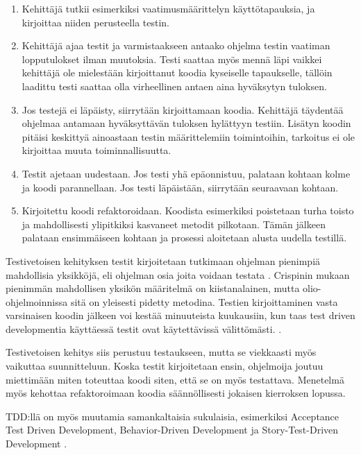 \documentclass[finnish]{tktltiki2}
\theoremstyle{definition}
\theoremstyle{remark}
\begin{document}
\begin{enumerate}

  \item Kehittäjä tutkii esimerkiksi vaatimusmäärittelyn käyttötapauksia, ja kirjoittaa niiden perusteella testin.

  \item Kehittäjä ajaa testit ja varmistaakseen antaako ohjelma testin vaatiman lopputulokset ilman muutoksia. Testi saattaa myös mennä läpi vaikkei kehittäjä ole mielestään kirjoittanut koodia kyseiselle tapaukselle, tällöin laadittu testi saattaa olla virheellinen antaen aina hyväksytyn tuloksen.

  \item Jos testejä ei läpäisty, siirrytään kirjoittamaan koodia. Kehittäjä täydentää ohjelmaa antamaan hyväksyttävän tuloksen hylättyyn testiin. Lisätyn koodin pitäisi keskittyä ainoastaan testin määrittelemiin toimintoihin, tarkoitus ei ole kirjoittaa muuta toiminnallisuutta.

 \item Testit ajetaan uudestaan. Jos testi yhä epäonnistuu, palataan kohtaan kolme ja koodi parannellaan. Jos testi läpäistään, siirrytään seuraavaan kohtaan.

 \item Kirjoitettu koodi refaktoroidaan. Koodista esimerkiksi poistetaan turha toisto ja mahdollisesti ylipitkiksi kasvaneet metodit pilkotaan. Tämän jälkeen palataan ensimmäiseen kohtaan ja prosessi aloitetaan alusta uudella testillä.

\end{enumerate}

Testivetoisen kehityksen testit kirjoitetaan tutkimaan ohjelman pienimpiä mahdollisia yksikköjä, eli ohjelman osia joita voidaan testata \cite{Crispin06}. Crispinin mukaan pienimmän mahdollisen yksikön määritelmä on kiistanalainen, mutta olio-ohjelmoinnissa sitä on yleisesti pidetty metodina. Testien kirjoittaminen vasta varsinaisen koodin jälkeen voi kestää minuuteista kuukausiin, kun taas test driven developmentia käyttäessä testit ovat käytettävissä välittömästi. \cite{Janzen05}. 

Testivetoisen kehitys siis perustuu testaukseen, mutta se viekkaasti myös vaikuttaa suunnitteluun. Koska testit kirjoitetaan ensin, ohjelmoija joutuu miettimään miten toteuttaa koodi siten, että se on myös testattava. Menetelmä myös  kehottaa refaktoroimaan koodia säännöllisesti jokaisen kierroksen lopussa.

TDD:llä on myös muutamia samankaltaisia sukulaisia, esimerkiksi 
Acceptance Test Driven Development, Behavior-Driven Development ja Story-Test-Driven Development \cite{Turhan10}.
\end{document}
